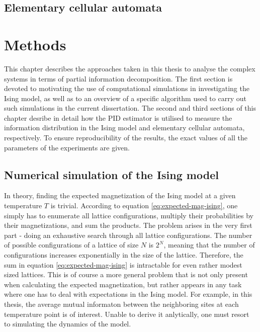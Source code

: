 \documentclass[12pt]{article}
\begin{document}
\subsection{Elementary cellular automata}

\newpage
\section{Methods}

This chapter describes the approaches taken in this thesis to analyse the complex systems in terms of partial information decomposition. The first section is devoted to motivating the use of computational simulations in investigating the Ising model, as well as to an overview of a specific algorithm used to carry out such simulations in the current dissertation. The second and third sections of this chapter desribe in detail how the PID estimator is utilised to measure the information distribution in the Ising model and elementary cellular automata, respectively. To ensure reproducibility of the results, the exact values of all the parameters of the experiments are given. 

\subsection{Numerical simulation of the Ising model}

In theory, finding the expected magnetization of the Ising model at a given temperature $T$ is trivial. According to equation \ref{eq:expected-mag-ising}, one simply has to enumerate all lattice configurations, multiply their probabilities by their magnetizations, and sum the products. The problem arises in the very first part - doing an exhaustive search through all lattice configurations. The number of possible configurations of a lattice of size $N$ is $2^N$, meaning that the number of configurations increases exponentially in the size of the lattice. Therefore, the sum in equation \ref{eq:expected-mag-ising} is intractable for even rather modest sized lattices. This is of course a more general problem that is not only present when calculating the expected magnetization, but rather appears in any task where one has to deal with expectations in the Ising model. For example, in this thesis, 
the average mutual informaton between the neighboring sites at each temperature point is of interest. Unable to derive it anlytically, one must resort to simulating the dynamics of the model. 
\end{document}
